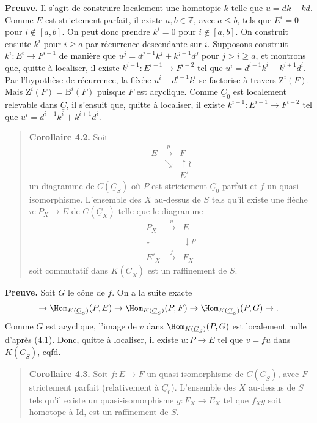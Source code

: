 \textbf{Preuve.} Il s'agit de construire localement une homotopie $k$ telle que $u = dk + kd$. Comme $E$ est strictement parfait, il existe $a, b \in \mathbb{Z}$, avec $a \leqslant b$, tels que $E^i = 0$ pour $i \notin [a, b]$. On peut donc prendre $k^i = 0$ pour $i \notin [a, b]$. On construit ensuite $k^i$ pour $i \geqslant a$ par récurrence descendante sur $i$. Supposons construit $k^i : E^i \to F^{i-1}$ de manière que $u^j = d^{j-1}k^j + k^{j+1}d^j$ pour $j > i \geqslant a$, et montrons que, quitte à localiser, il existe $k^{i-1} : E^{i-1} \to F^{i-2}$ tel que $u^i = d^{i-1}k^i + k^{i+1}d^i$. Par l'hypothèse de récurrence, la flèche $u^i - d^{i-1}k^i$ se factorise à travers $\mathrm{Z}^i(F)$. Mais $\mathrm{Z}^i(F) = \mathrm{B}^i(F)$ puisque $F$ est acyclique. Comme $\underline{C}_0$ est localement relevable dans $\underline{C}$, il s'ensuit que, quitte à localiser, il existe $k^{i-1} : E^{i-1} \to F^{i-2}$ tel que $u^i = d^{i-1}k^i + k^{i+1}d^i$.

\begin{quote}
\textbf{Corollaire 4.2.} Soit
\[
\begin{array}{ccc}
E & \xrightarrow{p} & F \\
& \searrow & \uparrow \wr \\
& & E'
\end{array}
\]
un diagramme de $C(\underline{C}_S)$ où $P$ est strictement $\underline{C}_0$-parfait et $f$ un quasi-isomorphisme. L'ensemble des $X$ au-dessus de $S$ tels qu'il existe une flèche $u : P_X \to E$ de $C(\underline{C}_X)$ telle que le diagramme
\[
\begin{array}{ccc}
P_X & \xrightarrow{u} & E \\
\downarrow & & \downarrow p \\
E'_X & \xrightarrow{f} & F_X
\end{array}
\]
soit commutatif dans $K(\underline{C}_X)$ est un raffinement de $S$.
\end{quote}

\textbf{Preuve.} Soit $G$ le cône de $f$. On a la suite exacte
\[
\to \Hom_{K(\underline{C}_S)}(P, E) \to \Hom_{K(\underline{C}_S)}(P, F) \to \Hom_{K(\underline{C}_S)}(P, G) \to.
\]
Comme $G$ est acyclique, l'image de $v$ dans $\Hom_{K(\underline{C}_S)}(P, G)$ est localement nulle d'après (4.1). Donc, quitte à localiser, il existe $u : P \to E$ tel que $v = fu$ dans $K(\underline{C}_S)$, cqfd.

\begin{quote}
\textbf{Corollaire 4.3.} Soit $f : E \to F$ un quasi-isomorphisme de $C(\underline{C}_S)$, avec $F$ strictement parfait (relativement à $\underline{C}_0$). L'ensemble des $X$ au-dessus de $S$ tels qu'il existe un quasi-isomorphisme $g : F_X \to E_X$ tel que $f_X g$ soit homotope à $\mathrm{Id}$, est un raffinement de $S$.
\end{quote}

